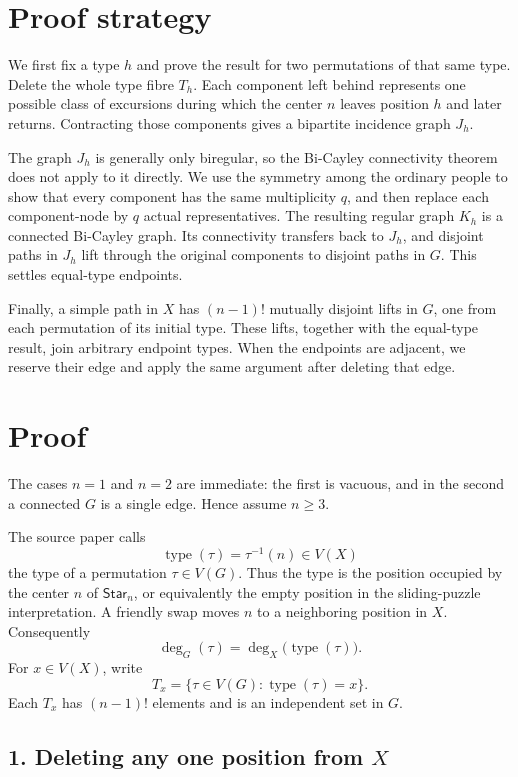\documentclass[11pt]{article}
\begin{document}
\section*{Proof strategy}

We first fix a type \(h\) and prove the result for two permutations of that same type. Delete the whole type fibre \(T_h\). Each component left behind represents one possible class of excursions during which the center \(n\) leaves position \(h\) and later returns. Contracting those components gives a bipartite incidence graph \(J_h\).

The graph \(J_h\) is generally only biregular, so the Bi-Cayley connectivity theorem does not apply to it directly. We use the symmetry among the ordinary people to show that every component has the same multiplicity \(q\), and then replace each component-node by \(q\) actual representatives. The resulting regular graph \(K_h\) is a connected Bi-Cayley graph. Its connectivity transfers back to \(J_h\), and disjoint paths in \(J_h\) lift through the original components to disjoint paths in \(G\). This settles equal-type endpoints.

Finally, a simple path in \(X\) has \((n-1)!\) mutually disjoint lifts in \(G\), one from each permutation of its initial type. These lifts, together with the equal-type result, join arbitrary endpoint types. When the endpoints are adjacent, we reserve their edge and apply the same argument after deleting that edge.

\section*{Proof}

The cases \(n=1\) and \(n=2\) are immediate: the first is vacuous, and in the second a connected \(G\) is a single edge. Hence assume \(n\geq 3\).

The source paper calls
\[
\operatorname{type}(\tau)=\tau^{-1}(n)\in V(X)
\]
the type of a permutation \(\tau\in V(G)\). Thus the type is the position occupied by the center \(n\) of \(\mathsf{Star}_n\), or equivalently the empty position in the sliding-puzzle interpretation. A friendly swap moves \(n\) to a neighboring position in \(X\). Consequently
\[
\deg_G(\tau)=\deg_X\bigl(\operatorname{type}(\tau)\bigr).\tag{1}
\]
For \(x\in V(X)\), write
\[
T_x=\{\tau\in V(G):\operatorname{type}(\tau)=x\}.
\]
Each \(T_x\) has \((n-1)!\) elements and is an independent set in \(G\).

\subsection*{1. Deleting any one position from \(X\)}
\end{document}
